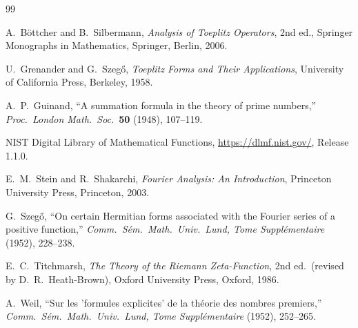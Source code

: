 \documentclass[11pt,a4paper]{article}
\theoremstyle{definition}
\theoremstyle{remark}
\begin{document}
\begin{thebibliography}{99}

A.~B\"ottcher and B.~Silbermann,
\emph{Analysis of Toeplitz Operators},
2nd ed., Springer Monographs in Mathematics, Springer, Berlin, 2006.

U.~Grenander and G.~Szeg\H{o},
\emph{Toeplitz Forms and Their Applications},
University of California Press, Berkeley, 1958.

A.~P.~Guinand,
``A summation formula in the theory of prime numbers,''
\emph{Proc.\ London Math.\ Soc.}\ \textbf{50} (1948), 107--119.

NIST Digital Library of Mathematical Functions,
\url{https://dlmf.nist.gov/}, Release 1.1.0.

E.~M.~Stein and R.~Shakarchi,
\emph{Fourier Analysis: An Introduction},
Princeton University Press, Princeton, 2003.

G.~Szeg\H{o},
``On certain Hermitian forms associated with the Fourier series of a positive function,''
\emph{Comm.\ S\'em.\ Math.\ Univ.\ Lund, Tome Suppl\'ementaire} (1952), 228--238.

E.~C.~Titchmarsh,
\emph{The Theory of the Riemann Zeta-Function},
2nd ed.\ (revised by D.~R.~Heath-Brown), Oxford University Press, Oxford, 1986.

A.~Weil,
``Sur les 'formules explicites' de la th\'eorie des nombres premiers,''
\emph{Comm.\ S\'em.\ Math.\ Univ.\ Lund, Tome Suppl\'ementaire} (1952), 252--265.

\end{thebibliography}
\end{document}
